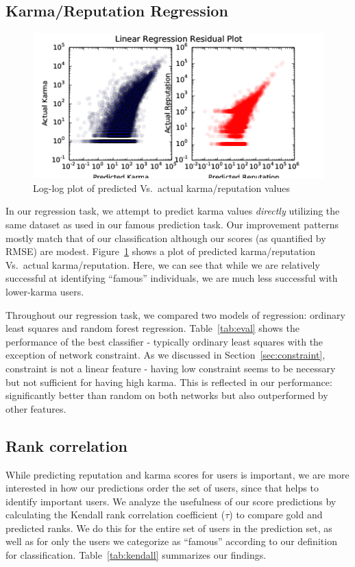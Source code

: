 \documentclass[11pt]{article}
\begin{document}
\subsection{Karma/Reputation Regression}
\label{sec:regression}
\begin{figure}[h]
\centering
\includegraphics[width=\linewidth]{residuals-png}
\caption{Log-log plot of predicted Vs.\ actual karma/reputation values}
\label{fig:residuals}
\end{figure}

In our regression task, we attempt to predict karma values \textit{directly}
utilizing the same dataset as used in our famous prediction task. Our
improvement patterns mostly match that of our classification although our scores
(as quantified by RMSE) are modest. Figure~\ref{fig:residuals} shows a plot
of predicted karma/reputation Vs.\ actual karma/reputation. Here, we can see that
while we are relatively successful at identifying ``famous'' individuals, we are
much less successful with lower-karma users.

Throughout our regression task, we compared two models of regression: ordinary least
squares  and random forest regression. Table~\ref{tab:eval} shows the performance of 
the best classifier - typically ordinary least squares with the exception of network
constraint. As we discussed in Section~\ref{sec:constraint}, constraint is not
a linear feature - having low constraint seems to be necessary but not sufficient
for having high karma. This is reflected in our performance: significantly better
than random on both networks but also outperformed by other features.

\subsection{Rank correlation}

While predicting reputation and karma scores for users is important, we are more
interested in how our predictions order the set of users, since that helps to
identify important users. We analyze the usefulness of our score predictions by
calculating the Kendall rank correlation coefficient ($\tau$) to compare gold
and predicted ranks. We do this for the entire set of users in the prediction
set, as well as for only the users we categorize as ``famous'' according to our
definition for classification. Table~\ref{tab:kendall} summarizes our findings.
\end{document}
